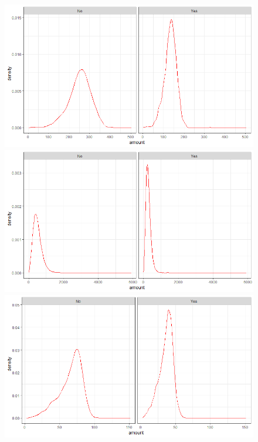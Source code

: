 \documentclass[12pt]{article}
\begin{document}
	\begin{figure}[h]
		\includegraphics[scale=0.40]{Img/prepostmuntligsporsmal.PNG}
		\includegraphics[scale=0.40]{Img/prepostskriftligsporsmal.PNG}
		\includegraphics[scale=0.40]{Img/prepostsporretimesporsmal.PNG}
	\end{figure}
	
	
\end{document}
